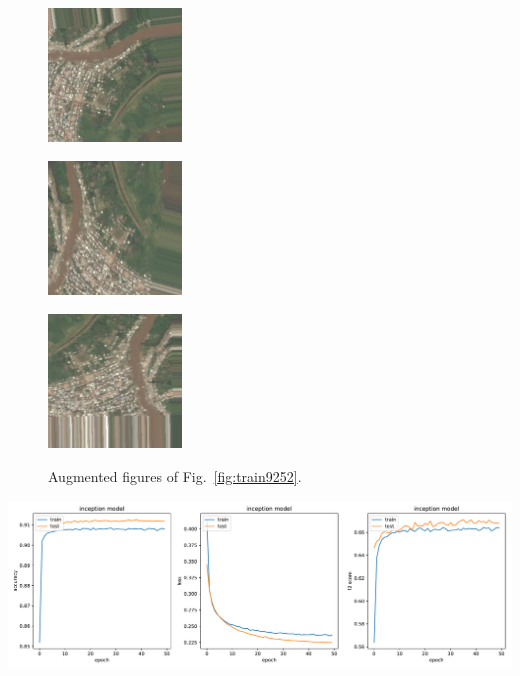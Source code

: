 \documentclass[11pt,oneside,a4paper]{article}
\newenvironment{Figure}
{\par\medskip\noindent\minipage{\linewidth}}
{\endminipage\par\medskip}
\begin{document}
\begin{figure}[htbp]
    \hspace{-4mm}
    \begin{minipage}{0.33\linewidth}
        \centering
        \includegraphics[width=1.4in]{train_9252_0_175.jpg}\\
    \end{minipage}
    \begin{minipage}{0.33\linewidth}
        \centering
        \includegraphics[width=1.4in]{train_9252_0_598.jpg}\\
    \end{minipage}
     \begin{minipage}{0.33\linewidth}
        \centering
        \includegraphics[width=1.4in]{train_9252_0_1710.jpg}\\
    \end{minipage}
    \caption{Augmented figures of Fig.~\ref{fig:train9252}.} 
    \label{fig:train_augment}
\end{figure}
\begin{Figure}
 \centering
 \includegraphics[width=1.\linewidth, height=0.35\linewidth]{inception_metrics.pdf}
 \label{fig:inception_metrics}
\end{Figure}
\end{document}
